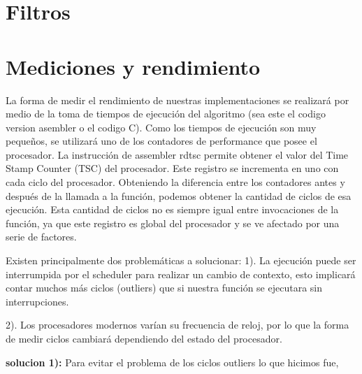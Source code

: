 \documentclass[a4paper]{article}
\begin{document}
\section{Filtros}







\section{Mediciones y rendimiento}

La forma de medir el rendimiento de nuestras implementaciones se realizará por medio de la toma de tiempos de ejecución del algoritmo (sea este el codigo version asembler o el codigo C). Como los tiempos de ejecución son muy pequeños, se utilizará uno de los contadores de performance que posee el procesador.
La instrucción de assembler rdtsc permite obtener el valor del Time Stamp Counter (TSC) del procesador. Este registro se incrementa en uno con cada ciclo del procesador. Obteniendo la diferencia entre los contadores antes y después de la llamada a la función, podemos obtener la cantidad de ciclos de esa ejecución. Esta cantidad de ciclos no es siempre igual entre invocaciones de la función, ya que este registro es global del procesador y se ve afectado por una serie de factores. \newline

Existen principalmente dos problemáticas a solucionar:
1). La ejecución puede ser interrumpida por el scheduler para realizar un cambio de contexto,
esto implicará contar muchos más ciclos (outliers) que si nuestra función se ejecutara sin
interrupciones.

2). Los procesadores modernos varían su frecuencia de reloj, por lo que la forma de medir
ciclos cambiará dependiendo del estado del procesador.
\newline

\textbf{solucion 1):} Para evitar el problema de los ciclos outliers lo que hicimos fue,
\end{document}
